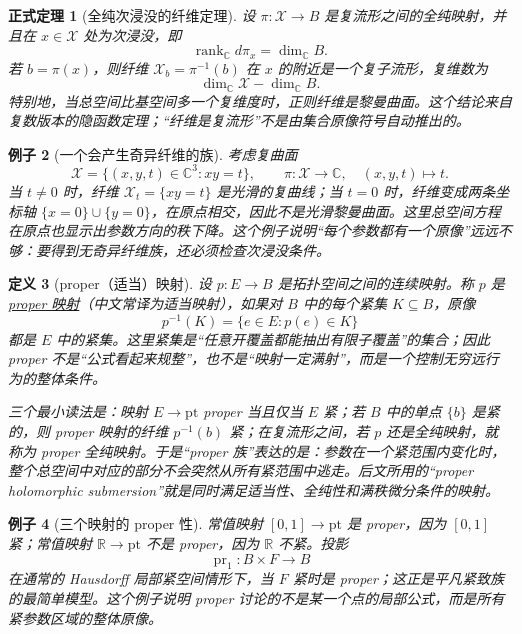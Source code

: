 \documentclass[UTF8,fontset=none,a4paper,11pt]{ctexart}
\theoremstyle{foundation-definition}
\newtheorem{definition}{定义}[section]
\theoremstyle{foundation-theorem}
\newtheorem{theorem}[definition]{正式定理}
\theoremstyle{foundation-proposition}
\theoremstyle{foundation-example}
\newtheorem{example}[definition]{例子}
\theoremstyle{foundation-remark}
\theoremstyle{foundation-theorem}
\newcommand{\term}[2]{\hyperref[#1]{#2}}
\begin{document}
\begin{theorem}[全纯次浸没的纤维定理]\label{thm:fiber-submanifold}
设 \(\pi:\mathcal X\to B\) 是复流形之间的全纯映射，并且在 \(x\in\mathcal X\) 处为次浸没，即
\[
  \operatorname{rank}_{\mathbb C}d\pi_x=\dim_{\mathbb C}B.
\]
若 \(b=\pi(x)\)，则纤维 \(\mathcal X_b=\pi^{-1}(b)\) 在 \(x\) 的附近是一个复子流形，复维数为
\[
  \dim_{\mathbb C}\mathcal X-\dim_{\mathbb C}B.
\]
特别地，当总空间比基空间多一个复维度时，正则纤维是黎曼曲面。这个结论来自复数版本的隐函数定理；“纤维是复流形”不是由集合原像符号自动推出的。
\end{theorem}

\begin{example}[一个会产生奇异纤维的族]
考虑复曲面
\[
  \mathcal X=\{(x,y,t)\in\mathbb C^3:xy=t\},
  \qquad \pi:\mathcal X\to\mathbb C,\quad (x,y,t)\longmapsto t.
\]
当 \(t\neq0\) 时，纤维 \(\mathcal X_t=\{xy=t\}\) 是光滑的复曲线；当 \(t=0\) 时，纤维变成两条坐标轴 \(\{x=0\}\cup\{y=0\}\)，在原点相交，因此不是光滑黎曼曲面。这里总空间方程在原点也显示出参数方向的秩下降。这个例子说明“每个参数都有一个原像”远远不够：要得到无奇异纤维族，还必须检查次浸没条件。
\end{example}

\begin{definition}[proper（适当）映射]\label{def:proper-map}
设 \(p:E\to B\) 是拓扑空间之间的连续映射。称 \(p\) 是\term{def:proper-map}{proper 映射}（中文常译为适当映射），如果对 \(B\) 中的每个紧集 \(K\subseteq B\)，原像
\[
  p^{-1}(K)=\{e\in E:p(e)\in K\}
\]
都是 \(E\) 中的紧集。这里紧集是“任意开覆盖都能抽出有限子覆盖”的集合；因此 proper 不是“公式看起来规整”，也不是“映射一定满射”，而是一个控制无穷远行为的整体条件。

三个最小读法是：映射 \(E\to\mathrm{pt}\) proper 当且仅当 \(E\) 紧；若 \(B\) 中的单点 \(\{b\}\) 是紧的，则 proper 映射的纤维 \(p^{-1}(b)\) 紧；在复流形之间，若 \(p\) 还是全纯映射，就称为 proper 全纯映射。于是“proper 族”表达的是：参数在一个紧范围内变化时，整个总空间中对应的部分不会突然从所有紧范围中逃走。后文所用的“proper holomorphic submersion”就是同时满足适当性、全纯性和满秩微分条件的映射。
\end{definition}

\begin{example}[三个映射的 proper 性]
常值映射 \([0,1]\to\mathrm{pt}\) 是 proper，因为 \([0,1]\) 紧；常值映射 \(\mathbb R\to\mathrm{pt}\) 不是 proper，因为 \(\mathbb R\) 不紧。投影
\[
  \operatorname{pr}_1:B\times F\to B
\]
在通常的 Hausdorff 局部紧空间情形下，当 \(F\) 紧时是 proper；这正是平凡紧致族的最简单模型。这个例子说明 proper 讨论的不是某一个点的局部公式，而是所有紧参数区域的整体原像。
\end{example}
\end{document}
